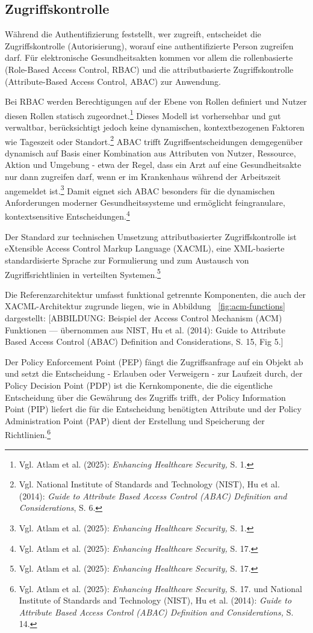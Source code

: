     \subsection{Zugriffskontrolle}
Während die Authentifizierung feststellt, wer zugreift, entscheidet die Zugriffskontrolle (Autorisierung), worauf eine authentifizierte Person zugreifen darf. Für elektronische Gesundheitsakten kommen vor allem die rollenbasierte (Role-Based Access Control, RBAC) und die attributbasierte Zugriffskontrolle (Attribute-Based Access Control, ABAC) zur Anwendung.

Bei RBAC werden Berechtigungen auf der Ebene von Rollen definiert und Nutzer diesen Rollen statisch zugeordnet.\footnote{Vgl. Atlam et al. (2025):  \textit{Enhancing Healthcare Security,} S. 1.} Dieses Modell ist vorhersehbar und gut verwaltbar, berücksichtigt jedoch keine dynamischen, kontextbezogenen Faktoren wie Tageszeit oder Standort.\footnote{Vgl. National Institute of Standards and Technology (NIST), Hu et al. (2014):  \textit{Guide to Attribute Based Access Control (ABAC) Definition and Considerations}, S. 6.} ABAC trifft Zugriffsentscheidungen demgegenüber dynamisch auf Basis einer Kombination aus Attributen von Nutzer, Ressource, Aktion und Umgebung - etwa der Regel, dass ein Arzt auf eine Gesundheitsakte nur dann zugreifen darf, wenn er im Krankenhaus während der Arbeitszeit angemeldet ist.\footnote{Vgl. Atlam et al. (2025):  \textit{Enhancing Healthcare Security,} S. 1.} Damit eignet sich ABAC besonders für die dynamischen Anforderungen moderner Gesundheitssysteme und ermöglicht feingranulare, kontextsensitive Entscheidungen.\footnote{Vgl. Atlam et al. (2025):  \textit{Enhancing Healthcare Security,} S. 17.}

Der Standard zur technischen Umsetzung attributbasierter Zugriffskontrolle ist eXtensible Access Control Markup Language (XACML), eine XML-basierte standardisierte Sprache zur Formulierung und zum Austausch von Zugriffsrichtlinien in verteilten Systemen.\footnote{Vgl. Atlam et al. (2025):  \textit{Enhancing Healthcare Security,} S. 17.}

Die Referenzarchitektur umfasst funktional getrennte Komponenten, die auch der XACML-Architektur zugrunde liegen, wie in Abbildung ~\ref{fig:acm-functions} dargestellt:
[ABBILDUNG: Beispiel der Access Control Mechanism (ACM) Funktionen — übernommen aus NIST, Hu et al. (2014): Guide to Attribute Based Access Control (ABAC) Definition and Considerations, S. 15, Fig 5.]

Der Policy Enforcement Point (PEP) fängt die Zugriffsanfrage auf ein Objekt ab und setzt die Entscheidung - Erlauben oder Verweigern - zur Laufzeit durch, der Policy Decision Point (PDP) ist die Kernkomponente, die die eigentliche Entscheidung über die Gewährung des Zugriffs trifft, der Policy Information Point (PIP) liefert die für die Entscheidung benötigten Attribute und der Policy Administration Point (PAP) dient der Erstellung und Speicherung der Richtlinien.\footnote{Vgl. Atlam et al. (2025):  \textit{Enhancing Healthcare Security,} S. 17. und National Institute of Standards and Technology (NIST), Hu et al. (2014):  \textit{Guide to Attribute Based Access Control (ABAC) Definition and Considerations,} S. 14.}

